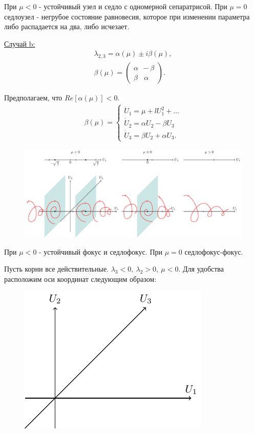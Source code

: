 При $\mu<0$ - устойчивый узел и седло с одномерной сепаратрисой. При $\mu=0$ седлоузел - негрубое состояние равновесия, которое при изменении параметра либо распадается на два, либо исчезает. 

\underline{Случай b:}
\begin{gather*}
	\lambda_{2,3}=\alpha(\mu)\pm i \beta(\mu), \\
	\beta(\mu)=
	\begin{pmatrix}
		\alpha~~-\beta \\
		\beta~~~~\alpha
	\end{pmatrix}
	.
\end{gather*}

Предполагаем, что $Re[\alpha(\mu)]<0$.
\begin{gather*}
	\beta(\mu)=
	\begin{cases}
		\dot U_1 = \mu+lU_1^2+\dots \\
		\dot U_2 = \alpha U_2-\beta U_3 \\
		\dot U_3 = \beta U_2+\alpha U_3.
	\end{cases}
\end{gather*}
\begin{figure}[H]
	\centering
	\includegraphics[width=1\linewidth]{fig/fig50.pdf}   
\end{figure}

При $\mu<0$ - устойчивый фокус и седлофокус. При $\mu=0$ седлофокус-фокус.

Пусть корни все действительные. $\lambda_3<0,~\lambda_2>0,~\mu<0$. Для удобства расположим оси координат следующим образом:
\begin{figure} 
	\vspace{0.1em}
	\centering
	\includegraphics[scale=1]{fig/fig51.pdf}
	\vspace{-0.25em}
\end{figure}

